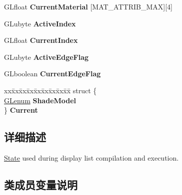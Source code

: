 \begin{DoxyCompactItemize}
\mbox{\label{structgl__dlist__state_a4634018b63a4c11d77f571fb03b7b2b4}} 
G\+Lfloat {\bfseries Current\+Material} \mbox{[}M\+A\+T\+\_\+\+A\+T\+T\+R\+I\+B\+\_\+\+M\+AX\mbox{]}\mbox{[}4\mbox{]}
\item 
\mbox{\label{structgl__dlist__state_ae3571adecc145bac64a2227bdd177779}} 
G\+Lubyte {\bfseries Active\+Index}
\item 
\mbox{\label{structgl__dlist__state_af7037b8d89fcff8e1e10adda76014d9c}} 
G\+Lfloat {\bfseries Current\+Index}
\item 
\mbox{\label{structgl__dlist__state_a2bdd3d43e2e4d6d72bc146f289ce21cc}} 
G\+Lubyte {\bfseries Active\+Edge\+Flag}
\item 
\mbox{\label{structgl__dlist__state_a340a26289308b695fd2f0e366ea2802c}} 
G\+Lboolean {\bfseries Current\+Edge\+Flag}
\item 
\mbox{\label{structgl__dlist__state_acd793e21c3d753fa185b70f33abcf8ac}} 
\begin{tabbing}
xx\=xx\=xx\=xx\=xx\=xx\=xx\=xx\=xx\=\kill
struct \{\\
\>\hyperlink{interfacevoid}{GLenum} {\bfseries ShadeModel}\\
\} {\bfseries Current}\\

\end{tabbing}\end{DoxyCompactItemize}


\subsection{详细描述}
\hyperlink{struct_state}{State} used during display list compilation and execution. 

\subsection{类成员变量说明}
\mbox{\label{structgl__dlist__state_ad0b0d1c41400e2b6ccf8f41982b8e2b3}} 
